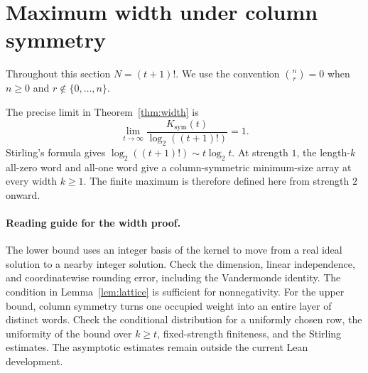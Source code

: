\documentclass[11pt]{article}
\newcommand{\Ksym}{K_{\mathrm{sym}}}
\begin{document}
\section{Maximum width under column symmetry}\label{sec:width}
Throughout this section \(N=(t+1)!\). We use the convention
\(\binom{n}{r}=0\) when \(n\ge0\) and \(r\notin\{0,\ldots,n\}\).

The precise limit in Theorem~\ref{thm:width} is
\[
\lim_{t\to\infty}\frac{\Ksym(t)}{\log_2((t+1)!)}=1.
\]
Stirling's formula gives \(\log_2((t+1)!)\sim t\log_2 t\).
At strength \(1\), the length-\(k\) all-zero word and all-one word
give a column-symmetric minimum-size array at every width \(k\ge1\).
The finite maximum is therefore defined here from strength \(2\) onward.

\paragraph{Reading guide for the width proof.}
The lower bound uses an integer basis of the kernel to move from a
real ideal solution to a nearby integer solution. Check the
dimension, linear independence, and coordinatewise rounding error,
including the Vandermonde identity. The condition in
Lemma~\ref{lem:lattice} is sufficient for nonnegativity. For the
upper bound, column symmetry turns one occupied weight into an
entire layer of distinct words. Check the conditional distribution
for a uniformly chosen row, the uniformity of the bound over
\(k\ge t\), fixed-strength finiteness, and the Stirling estimates.
The asymptotic estimates remain outside the current Lean development.
\end{document}
